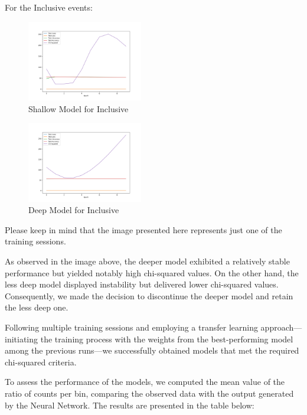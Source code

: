 \documentclass[EPJ,twocolumn]{webofc}
\begin{document}
For the Inclusive events:

\begin{figure}[H]
\centering
    \includegraphics[width=0.45\textwidth]{graphs/nn_incl_metrics.png}
    \caption{Shallow Model for Inclusive}
    \label{fig:accuracy_loss_incl}
\end{figure}
\hfill
\begin{figure}[H]
\centering
    \includegraphics[width=0.45\textwidth]{graphs/nn_incl_metrics_deeper.png}
    \caption{Deep Model for Inclusive}
    \label{fig:accuracy_loss_incl_deep}
\end{figure}




Please keep in mind that the image presented here represents just one of the training sessions.

As observed in the image above, the deeper model exhibited a relatively stable performance but yielded notably high chi-squared values. On the other hand, the less deep model displayed instability but delivered lower chi-squared values. Consequently, we made the decision to discontinue the deeper model and retain the less deep one.

Following multiple training sessions and employing a transfer learning approach—initiating the training process with the weights from the best-performing model among the previous runs—we successfully obtained models that met the required chi-squared criteria.

To assess the performance of the models, we computed the mean value of the ratio of counts per bin, comparing the observed data with the output generated by the Neural Network.
The results are presented in the table below:
\end{document}
